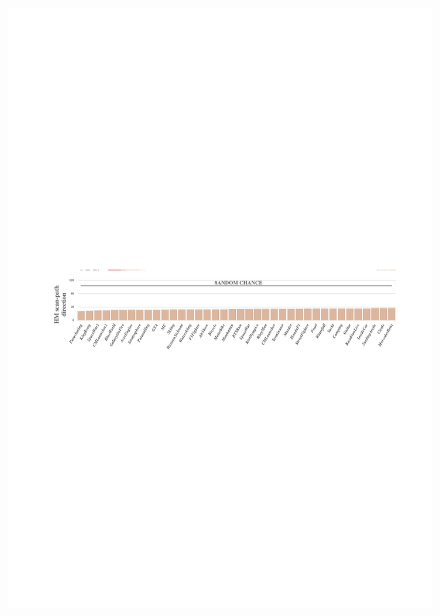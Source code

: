 \documentclass[10pt,journal,compsoc]{IEEEtran}
\begin{document}
\begin{figure}
	\begin{center}
		\centerline{\includegraphics[width=2\columnwidth]{figures/database/direction-consistence1}}%
	\end{center}
\end{figure}
\end{document}
